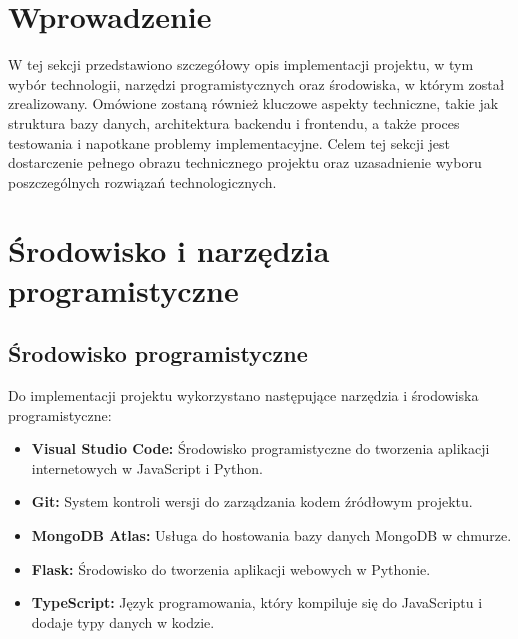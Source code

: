 






\section{Wprowadzenie}
W tej sekcji przedstawiono szczegółowy opis implementacji projektu, w tym wybór technologii, narzędzi programistycznych oraz środowiska, w którym został zrealizowany. Omówione zostaną również kluczowe aspekty techniczne, takie jak struktura bazy danych, architektura backendu i frontendu, a także proces testowania i napotkane problemy implementacyjne. Celem tej sekcji jest dostarczenie pełnego obrazu technicznego projektu oraz uzasadnienie wyboru poszczególnych rozwiązań technologicznych.


\section{Środowisko i narzędzia programistyczne}

\subsection{Środowisko programistyczne}
Do implementacji projektu wykorzystano następujące narzędzia i środowiska programistyczne:
\begin{itemize}
    \item \textbf{Visual Studio Code:} Środowisko programistyczne do tworzenia aplikacji internetowych w JavaScript i Python.
    \item \textbf{Git:} System kontroli wersji do zarządzania kodem źródłowym projektu.
    \item \textbf{MongoDB Atlas:} Usługa do hostowania bazy danych MongoDB w chmurze.
    \item \textbf{Flask:} Środowisko do tworzenia aplikacji webowych w Pythonie.
    \item \textbf{TypeScript:} Język programowania, który kompiluje się do JavaScriptu i dodaje typy danych w kodzie.
\end{itemize}
